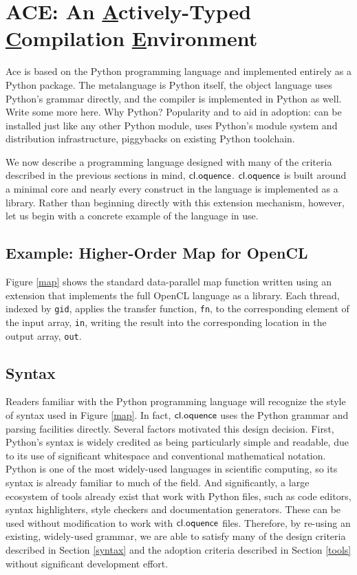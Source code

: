 \documentclass[10pt, conference, compsocconf]{IEEEtran}
\begin{document}
\section{ACE: An \underline{A}ctively-Typed \underline{C}ompilation \underline{E}nvironment}
Ace is based on the Python programming language and implemented entirely as a Python package. The metalanguage is Python itself, the object language uses Python's grammar directly, and the compiler is implemented in Python as well. Write some more here. Why Python? Popularity and to aid in adoption: can be installed just like any other Python module, uses Python's module system and distribution infrastructure, piggybacks on existing Python toolchain. 

We now describe a programming language designed with many of the criteria described in the previous sections in mind, $\textsf{cl.oquence}$. $\textsf{cl.oquence}$ is built around a minimal core and nearly every construct in the language is implemented as a library. Rather than beginning directly with this extension mechanism, however, let us begin with a concrete example of the language in use.

\subsection{Example: Higher-Order Map for OpenCL}
Figure \ref{map} shows the standard data-parallel map function written using an extension that implements the full OpenCL language as a library. Each thread, indexed by \verb|gid|, applies the transfer function, \verb|fn|, to the  corresponding element of the input array, \verb|in|, writing the result into the corresponding location in the output array, \verb|out|.

\subsection{Syntax}
Readers familiar with the Python programming language will recognize the style of syntax used in Figure \ref{map}. In fact, $\textsf{cl.oquence}$ uses the Python grammar and parsing facilities directly. Several factors motivated this design decision. First, Python's syntax is widely credited as being particularly simple and readable, due to its use of significant whitespace and conventional mathematical notation. Python is one of the most widely-used languages in scientific computing, so its syntax is already familiar to much of the field. And significantly, a large ecosystem of tools already exist that work with Python files, such as code editors, syntax highlighters, style checkers and documentation generators. These can be used without modification to work with $\textsf{cl.oquence}$ files. Therefore, by re-using an existing, widely-used grammar, we are able to satisfy many of the design criteria described in Section \ref{syntax} and the adoption criteria described in Section \ref{tools} without significant development effort.
\end{document}
